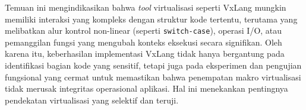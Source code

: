 Temuan ini mengindikasikan bahwa \textit{tool} virtualisasi seperti VxLang mungkin memiliki interaksi yang kompleks dengan struktur kode tertentu, terutama yang melibatkan alur kontrol non-linear (seperti \texttt{switch-case}), operasi I/O, atau pemanggilan fungsi yang mengubah konteks eksekusi secara signifikan. Oleh karena itu, keberhasilan implementasi VxLang tidak hanya bergantung pada identifikasi bagian kode yang sensitif, tetapi juga pada eksperimen dan pengujian fungsional yang cermat untuk memastikan bahwa penempatan makro virtualisasi tidak merusak integritas operasional aplikasi. Hal ini menekankan pentingnya pendekatan virtualisasi yang selektif dan teruji.
